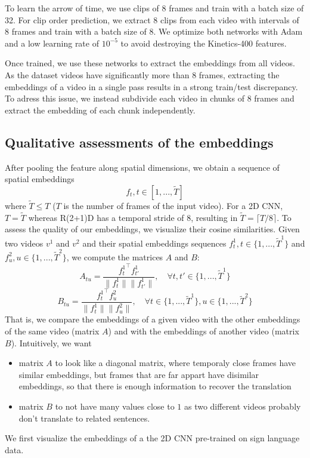 \documentclass[final]{cvpr}
\begin{document}
To learn the arrow of time, we use clips of 8 frames and train with a batch size of 32. For clip order prediction, we extract 8 clips from each video with intervals of 8 frames and train with a batch size of 8. We optimize both networks with Adam and a low learning rate of $10^{-5}$ to avoid destroying the Kinetics-400 features.

Once trained, we use these networks to extract the embeddings from all videos. As the dataset videos have significantly more than 8 frames,  extracting the embeddings of a video in a single pass results in a strong train/test discrepancy. To adress this issue, we instead subdivide each video in chunks of 8 frames and extract the embedding of each chunk independently.
\subsection{Qualitative assessments of the embeddings}
After pooling the feature along spatial dimensions, we obtain a sequence of spatial embeddings
$$f_t, t\in[1, ..., \tilde{T}]$$
where $\tilde{T}\leq T$ ($T$ is the number of frames of the input video). For a 2D CNN, $T=\tilde{T}$ whereas R(2+1)D has a temporal stride of $8$, resulting in $\tilde{T} = \lceil T/8 \rceil$.
To assess the quality of our embeddings, we visualize their cosine similarities. Given two videos $v^1$ and $v^2$ and their spatial embeddings sequences $f_t^1, t\in\{1, ..., \tilde{T}^1\}$ and $f_u^2, u\in \{1, ...,  \tilde{T}^2\}$, we compute the matrices $A$ and $B$:
$$A_{tu} = \frac{{f_t^1}^\intercal f_{t'}^1}{\lVert f_t^1 \rVert \lVert f_{t'}^1 \rVert}, \quad\forall t, t' \in\{1, ..., \tilde{T}^1\}$$
$$B_{tu} = \frac{{f_t^1}^\intercal f_u^2}{\lVert f_t^1 \rVert \lVert f_u^2 \rVert}, \quad \forall t \in\{1, ..., \tilde{T}^1\}, u \in\{1, ..., \tilde{T}^2\}$$
That is, we compare the embeddings of a given video with the other embeddings of the same video (matrix $A$) and with the embeddings of another video (matrix $B$). Intuitively, we want 
\begin{itemize}
	\item matrix $A$ to look like a diagonal matrix, where temporaly close frames have similar embeddings, but frames that are far appart have disimilar embeddings, so that there is enough information to recover the translation
	\item matrix $B$ to not have many values close to $1$ as two different videos probably don't translate to related sentences.
\end{itemize}

We first visualize the embeddings of a the 2D CNN pre-trained on sign language data.


{\small


}
\end{document}
